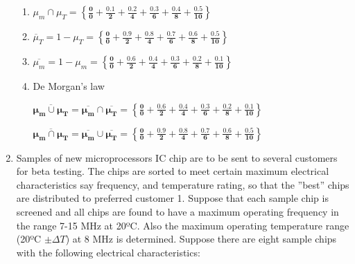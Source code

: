 \documentclass{article}
\begin{document}
\begin{enumerate}
\begin{enumerate}
          \item ${\mu}_m \cap {\mu}_T = \boldsymbol{\left\{
                    \frac{0}{0} +
                    \frac{0.1}{2} +
                    \frac{0.2}{4} +
                    \frac{0.3}{6} +
                    \frac{0.4}{8} +
                    \frac{0.5}{10}
                    \right\}}$

          \item $\overline{{\mu}}_T = 1 - {\mu}_T = \boldsymbol{\left\{
                    \frac{0}{0} +
                    \frac{0.9}{2} +
                    \frac{0.8}{4} +
                    \frac{0.7}{6} +
                    \frac{0.6}{8} +
                    \frac{0.5}{10}
                    \right\}}$

          \item $\overline{{\mu}_m} = 1 - {\mu}_m = \boldsymbol{\left\{
                    \frac{0}{0} +
                    \frac{0.6}{2} +
                    \frac{0.4}{4} +
                    \frac{0.3}{6} +
                    \frac{0.2}{8} +
                    \frac{0.1}{10}
                    \right\}}$

          \item De Morgan's law

                $\boldsymbol{\overline{{\mu}_m \cup {\mu}_T} =
                    \overline{{\mu}_m} \cap \overline{{\mu}_T} =
                    \left\{
                    \frac{0}{0} +
                    \frac{0.6}{2} +
                    \frac{0.4}{4} +
                    \frac{0.3}{6} +
                    \frac{0.2}{8} +
                    \frac{0.1}{10}
                    \right\}}$

                $\boldsymbol{\overline{{\mu}_m \cap {\mu}_T} =
                    \overline{{\mu}_m} \cup \overline{{\mu}_T} =\left\{
                    \frac{0}{0} +
                    \frac{0.9}{2} +
                    \frac{0.8}{4} +
                    \frac{0.7}{6} +
                    \frac{0.6}{8} +
                    \frac{0.5}{10}
                    \right\}}$
        \end{enumerate}

  \item Samples of new microprocessors IC chip are to be sent to several customers for beta testing. The chips are sorted to meet certain maximum electrical characteristics say frequency, and temperature rating, so that the ''best'' chips are distributed to preferred customer 1. Suppose that each sample chip is screened and all chips are found to have a maximum operating frequency in the range 7-15 MHz at 20ºC. Also the maximum operating temperature range (20ºC $\pm \Delta T$) at 8 MHz is determined. Suppose there are eight sample chips with the following electrical characteristics:


\end{enumerate}
\end{document}
